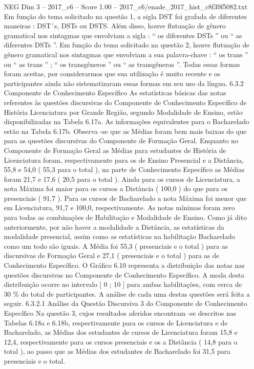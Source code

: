 \begin{textsample}{NEG Dim 3 – 2017\_c6 – Score 1.00 – 2017\_c6/enade\_2017\_hist\_c8f39f5082.txt}
Em função do tema solicitado na questão 1, a sigla DST foi grafada de diferentes maneiras : DST´s, DSTs ou DSTS.
Além disso, houve flutuação de gênero gramatical nos sintagmas que envolviam a sigla : “ os diferentes DSTs ” ou “ as diferentes DSTs ”.
Em função do tema solicitado na questão 2, houve flutuação de gênero gramatical nos sintagmas que envolviam a sua palavra-chave : “ os trans ” ou “ as trans ” ; “ os transgêneros ” ou “ as transgêneras ”.
Todas essas formas foram aceitas, por considerarmos que sua utilização é muito recente e os participantes ainda não sistematizaram essas formas em seu uso da língua. 6.3.2 Componente de Conhecimento Específico As estatísticas básicas das notas referentes às questões discursivas do Componente de Conhecimento Específico de História Licenciatura por Grande Região, segundo Modalidade de Ensino, estão disponibilizadas na Tabela 6.17a.
As informações equivalentes para o Bacharelado estão na Tabela 6.17b.
Observa -se que as Médias foram bem mais baixas do que para as questões discursivas do Componente de Formação Geral.
Enquanto no Componente de Formação Geral as Médias para estudantes de História de Licenciatura foram, respectivamente para os de Ensino Presencial e a Distância, 55,8 e 54,0 ( 55,3 para o total ), na parte de Conhecimento Específico as Médias foram 21,7 e 17,6 ( 20,5 para o total ).
Ainda para os cursos de Licenciatura, a nota Máxima foi maior para os cursos a Distância ( 100,0 ) do que para os presenciais ( 91,7 ).
Para os cursos de Bacharelado a nota Máxima foi menor que em Licenciatura, 91,7 e 100,0, respectivamente.
As notas mínimas foram zero para todas as combinações de Habilitação e Modalidade de Ensino.
Como já dito anteriormente, por não haver a modalidade a Distância, as estatísticas da modalidade presencial, assim como as estatísticas na habilitação Bacharelado como um todo são iguais.
A Média foi 55,3 ( presenciais e o total ) para as discursivas de Formação Geral e 27,1 ( presenciais e o total ) para as de Conhecimento Específico.
O Gráfico 6.10 representa a distribuição das notas nas questões discursivas no Componente de Conhecimento Específico.
A moda desta distribuição ocorre no intervalo [ 0 ; 10 ] para ambas habilitações, com cerca de 30 \% do total de participantes.
A análise de cada uma destas questões será feita a seguir. 6.3.2.1 Análise da Questão Discursiva 3 do Componente de Conhecimento Específico Na questão 3, cujos resultados aferidos encontram -se descritos nas Tabelas 6.18a e 6.18b, respectivamente para os cursos de Licenciatura e de Bacharelado, as Médias dos estudantes de cursos de Licenciatura foram 15,8 e 12,4, respectivamente para os cursos presenciais e os a Distância ( 14,8 para o total ), ao passo que as Médias dos estudantes de Bacharelado foi 31,5 para presenciais e o total.

\end{textsample}
